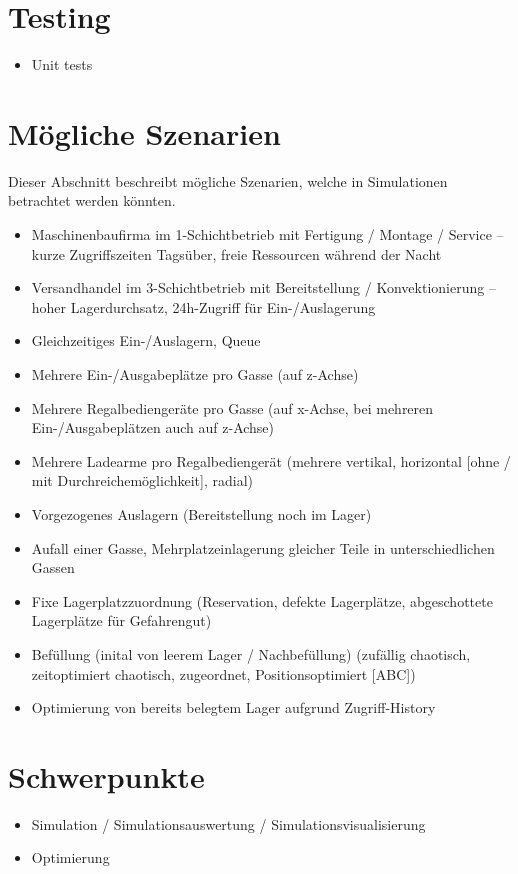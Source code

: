 \documentclass[11pt,a4paper]{article}
\begin{document}
\section{Testing}
\begin{itemize}
  \item Unit tests
\end{itemize}
%
\section{Mögliche Szenarien}
Dieser Abschnitt beschreibt mögliche Szenarien, welche in Simulationen betrachtet werden könnten.
%
\begin{itemize}
  \item Maschinenbaufirma im 1-Schichtbetrieb mit Fertigung / Montage / Service -- kurze Zugriffszeiten Tagsüber, freie Ressourcen während der Nacht
  \item Versandhandel im 3-Schichtbetrieb mit Bereitstellung / Konvektionierung --  hoher Lagerdurchsatz, 24h-Zugriff für Ein-/Auslagerung
  \item Gleichzeitiges Ein-/Auslagern, Queue
  \item Mehrere Ein-/Ausgabeplätze pro Gasse (auf z-Achse)
  \item Mehrere Regalbediengeräte pro Gasse (auf x-Achse, bei mehreren Ein-/Ausgabeplätzen auch auf z-Achse)
  \item Mehrere Ladearme pro Regalbediengerät (mehrere vertikal, horizontal [ohne / mit Durchreichemöglichkeit], radial)
  \item Vorgezogenes Auslagern (Bereitstellung noch im Lager)
  \item Aufall einer Gasse, Mehrplatzeinlagerung gleicher Teile in unterschiedlichen Gassen
  \item Fixe Lagerplatzzuordnung (Reservation, defekte Lagerplätze, abgeschottete Lagerplätze für Gefahrengut)
  \item Befüllung (inital von leerem Lager / Nachbefüllung) (zufällig chaotisch, zeitoptimiert chaotisch, zugeordnet, Positionsoptimiert [ABC])
  \item Optimierung von bereits belegtem Lager aufgrund Zugriff-History
\end{itemize}
%
\section{Schwerpunkte}
\begin{itemize}
  \item Simulation / Simulationsauswertung / Simulationsvisualisierung
  \item Optimierung
\end{itemize}
%
\end{document}
